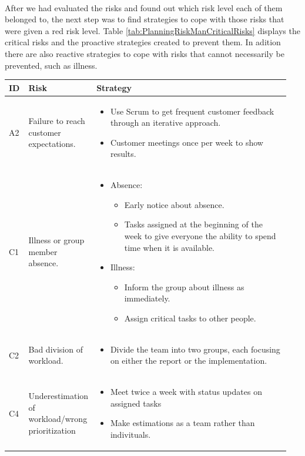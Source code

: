 \paragraph{}After we had evaluated the risks and found out which risk level each of them belonged to, the next step was to find strategies to cope with those risks that were given a red risk level. Table \ref{tab:PlanningRiskManCriticalRisks} displays the critical risks and the proactive strategies created to prevent them. In adition there are also reactive strategies to cope with risks that cannot necessarily be prevented, such as illness.
%
\begin{tabular}{|p{0.07\linewidth}|p{0.18\linewidth}|p{0.7\linewidth}|}
    \cellcolor{gray!25} \textbf{ID} & \cellcolor{gray!25} \textbf{Risk} & \cellcolor{gray!25} \textbf{Strategy} \\
    \hline
    A2 & Failure to reach customer expectations. & 
      \begin{itemize}
        \item Use Scrum to get frequent customer feedback through an iterative approach.
        \item Customer meetings once per week to show results.
      \end{itemize} \\
    C1 & Illness or group member absence. &
      \begin{itemize}
        \item Absence:
          \begin{itemize}
            \item Early notice about absence.
            \item Tasks assigned at the beginning of the week to give everyone the ability to spend time when it is available.
          \end{itemize}
        \item Illness:
          \begin{itemize}
            \item Inform the group about illness as immediately.
            \item Assign critical tasks to other people.
          \end{itemize}
      \end{itemize} \\
    C2 & Bad division of workload. &
      \begin{itemize}
        \item Divide the team into two groups, each focusing on either the report or the implementation.
      \end{itemize} \\
    C4 & Underestimation of workload/wrong prioritization &
      \begin{itemize}
        \item Meet twice a week with status updates on assigned tasks
        \item Make estimations as a team rather than indivituals.
      \end{itemize}
\end{tabular}

